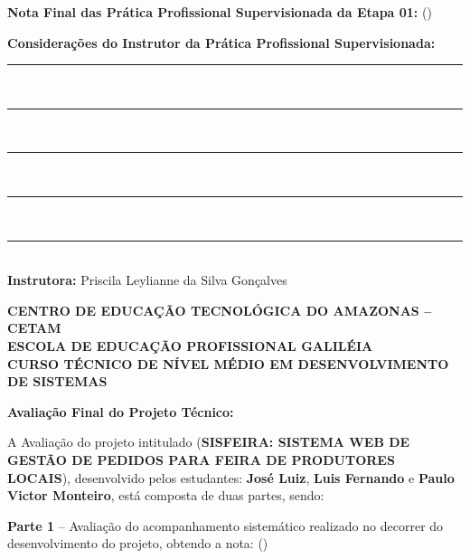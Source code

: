 \documentclass[12pt,a4paper]{article}
\newcommand{\varInstituicao}{CENTRO DE EDUCAÇÃO TECNOLÓGICA DO AMAZONAS -- CETAM}
\newcommand{\varEscola}{ESCOLA DE EDUCAÇÃO PROFISSIONAL GALILÉIA}
\newcommand{\varCurso}{CURSO TÉCNICO DE NÍVEL MÉDIO EM DESENVOLVIMENTO DE SISTEMAS}
\newcommand{\varTitulo}{SISFEIRA: SISTEMA WEB DE GESTÃO DE PEDIDOS PARA FEIRA DE PRODUTORES LOCAIS}
\newcommand{\varEstudanteUm}{José Luiz}
\newcommand{\varEstudanteDois}{Luis Fernando}
\newcommand{\varEstudanteTres}{Paulo Victor Monteiro}
\newcommand{\varInstrutora}{Priscila Leylianne da Silva Gonçalves}
\begin{document}
\vspace{0.8cm}
\noindent \textbf{Nota Final das Prática Profissional Supervisionada da Etapa 01:} (\hspace{1.5cm})

\vspace{0.6cm}
\noindent \textbf{Considerações do Instrutor da Prática Profissional Supervisionada:}
\vspace{0.2cm}

\noindent\rule{\textwidth}{0.4pt}\\[0.5cm]
\rule{\textwidth}{0.4pt}\\[0.5cm]
\rule{\textwidth}{0.4pt}\\[0.5cm]
\rule{\textwidth}{0.4pt}\\[0.5cm]
\rule{\textwidth}{0.4pt}

\vspace{1.2cm}
\begin{center}
    \underline{\hspace{9cm}}\\
    \textbf{Instrutora:} \varInstrutora
\end{center}
\newpage

\thispagestyle{empty}
\begin{center}
    {\bfseries\MakeUppercase{\varInstituicao}}\\[0.2cm]
    {\bfseries\MakeUppercase{\varEscola}}\\[0.2cm]
    {\bfseries\MakeUppercase{\varCurso}}
    
    \vspace{1.2cm}
    
    {\bfseries Avaliação Final do Projeto Técnico:}
\end{center}

\vspace{0.6cm}
\noindent A Avaliação do projeto intitulado (\textbf{\varTitulo}), desenvolvido pelos estudantes: \textbf{\varEstudanteUm}, \textbf{\varEstudanteDois} e \textbf{\varEstudanteTres}, está composta de duas partes, sendo:

\vspace{0.6cm}
\noindent \textbf{Parte 1} -- Avaliação do acompanhamento sistemático realizado no decorrer do desenvolvimento do projeto, obtendo a nota: (\hspace{1.5cm})\underline{\hspace{3.5cm}}
\end{document}
